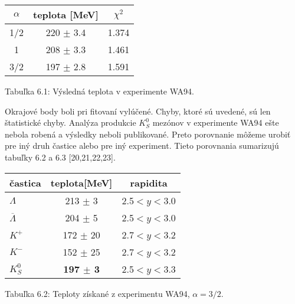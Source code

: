 \begin{center}
\begin{tabular}{|c|c|c|}
\hline 
$\alpha$ & teplota [MeV] & $\chi^{2}$ \\
\hline 
1/2 & 220 $\pm$ 3.4 & 1.374 \\ \hline
1 & 208 $\pm$ 3.3 & 1.461 \\ \hline
3/2 & 197 $\pm$ 2.8 & 1.591 \\ \hline

\end{tabular}
\end{center}
\begin{center}
  Tabuľka 6.1: Výsledná teplota v experimente WA94. 
\end{center}



Okrajové body boli pri fitovaní vylúčené.  Chyby, ktoré sú uvedené, sú len
štatistické chyby. Analýza produkcie   $K^{0}_{S}$ mezónov v experimente WA94
ešte nebola robená a výsledky neboli publikované. Preto porovnanie môžeme
urobiť pre iný druh častice alebo pre iný experiment. Tieto porovnania
sumarizujú tabuľky 6.2 a 6.3 [20,21,22,23].

\newpage
\begin{center}
\begin{tabular}{|l|c|c|}
\hline 
častica & teplota[MeV] & rapidita  \\
\hline \hline   
$\Lambda$ & 213 $\pm$ 3 & 2.5$<y<$3.0  \\ \cline{2-3}
$\overline{\Lambda}$ & 204 $\pm$ 5  & 2.5$<y<$3.0 \\ \cline{2-3}
$K^{+}$ & 172 $\pm$ 20 & 2.7$<y<$3.2 \\ \cline{2-3}
$K^{-}$ & 152 $\pm$ 25 & 2.7$<y<$3.2 \\ \cline{2-3}
$K^{0}_{S}$ & {\bf 197  ${\pm}$   3} & 2.5$<y<$3.3 \\
\hline

\end{tabular}
\end{center}
\begin{center}
  Tabuľka 6.2: Teploty získané z experimentu WA94, $\alpha=3/2$.
\end{center}

